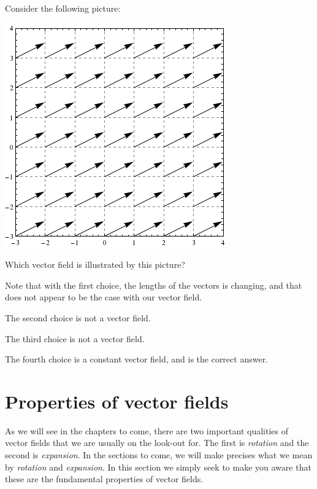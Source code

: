 \documentclass{ximera}
\begin{document}
\begin{question}
  Consider the following picture:
  \begin{image}
    \includegraphics{constField.png}
  \end{image}
  Which vector field is illustrated by this picture?
  \begin{multipleChoice}
  \end{multipleChoice}
  \begin{feedback}[correct]
    Note that with the first choice, the lengths of the vectors is
    changing, and that does not appear to be the case with our vector
    field.

    The second choice is not a vector field.

    The third choice is not a vector field.

    The fourth choice is a constant vector field, and is the correct answer. 
  \end{feedback}
\end{question}



\section{Properties of vector fields}

As we will see in the chapters to come, there are two important
qualities of vector fields that we are usually on the look-out
for. The first is \textit{rotation} and the second is
\textit{expansion}. In the sections to come, we will make precises
what we mean by \textit{rotation} and \textit{expansion}. In this
section we simply seek to make you aware that these are the
fundamental properties of vector fields.
\end{document}
